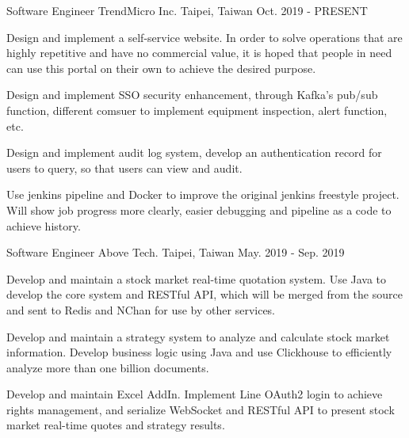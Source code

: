 

\begin{cventries}

\cventry
{Software Engineer} %
{TrendMicro Inc.} %
{Taipei, Taiwan} %
{Oct. 2019 - PRESENT} %
{
  \begin{cvitems} %
    \item {Design and implement a self-service website. In order to solve operations that are highly repetitive and have no commercial value, it is hoped that people in need can use this portal on their own to achieve the desired purpose.}
    \item {Design and implement SSO security enhancement, through Kafka's pub/sub function, different comsuer to implement equipment inspection, alert function, etc.}
    \item {Design and implement audit log system, develop an authentication record for users to query, so that users can view and audit.}
    \item {Use jenkins pipeline and Docker to improve the original jenkins freestyle project. Will show job progress more clearly, easier debugging and pipeline as a code to achieve history.}
  \end{cvitems}
}

\cventry
{Software Engineer} %
{Above Tech.} %
{Taipei, Taiwan} %
{May. 2019 - Sep. 2019} %
{
  \begin{cvitems} %
    \item {Develop and maintain a stock market real-time quotation system. Use Java to develop the core system and RESTful API, which will be merged from the source and sent to Redis and NChan for use by other services.}
    \item {Develop and maintain a strategy system to analyze and calculate stock market information. Develop business logic using Java and use Clickhouse to efficiently analyze more than one billion documents.}
    \item {Develop and maintain Excel AddIn. Implement Line OAuth2 login to achieve rights management, and serialize WebSocket and RESTful API to present stock market real-time quotes and strategy results.}
  \end{cvitems}
}


\end{cventries}
